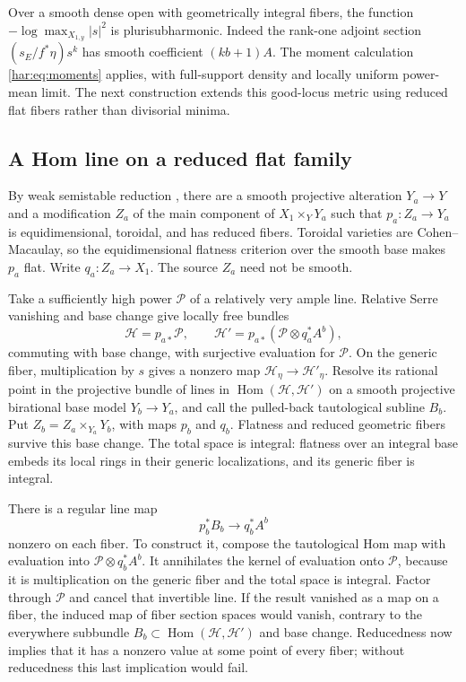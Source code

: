 Over a smooth dense open with geometrically integral fibers, the
function \(-\log\max_{X_{1,y}}|s|^2\) is plurisubharmonic. Indeed the
rank-one adjoint section \((s_E/f^*\eta)s^k\) has smooth coefficient
\((kb+1)A\). The moment calculation
\eqref{har:eq:moments} applies, with full-support density and locally
uniform power-mean limit. The next construction extends this good-locus
metric using reduced flat fibers rather than divisorial minima.

\subsection{A Hom line on a reduced flat family}\label{har:subsec:homline}

By weak semistable reduction \cite[Theorem~0.3]{AK2000},
there are a smooth projective alteration \(Y_a\to Y\) and a
modification \(Z_a\) of the main component of \(X_1\times_Y Y_a\)
such that \(p_a:Z_a\to Y_a\) is equidimensional, toroidal, and has
reduced fibers. Toroidal varieties are Cohen--Macaulay, so the
equidimensional flatness criterion over the smooth base makes
\(p_a\) flat. Write \(q_a:Z_a\to X_1\). The source \(Z_a\) need not
be smooth.

Take a sufficiently high power \(\mathcal P\) of a relatively very
ample line. Relative Serre vanishing and base change give locally
free bundles
\[
 \mathcal H=p_{a*}\mathcal P,\qquad
 \mathcal H'=p_{a*}(\mathcal P\otimes q_a^*A^b),
\]
commuting with base change, with surjective evaluation for
\(\mathcal P\). On the generic fiber, multiplication by \(s\) gives
a nonzero map \(\mathcal H_\eta\to\mathcal H'_\eta\). Resolve its
rational point in the projective bundle of lines in
\(\operatorname{Hom}(\mathcal H,\mathcal H')\) on a smooth projective
birational base model \(Y_b\to Y_a\), and call the pulled-back
tautological subline \(B_b\). Put \(Z_b=Z_a\times_{Y_a}Y_b\), with
maps \(p_b\) and \(q_b\). Flatness and reduced geometric fibers
survive this base change. The total space is integral: flatness over
an integral base embeds its local rings in their generic localizations,
and its generic fiber is integral.

There is a regular line map
\begin{equation}\label{har:eq:homline}
 p_b^*B_b\longrightarrow q_b^*A^b
\end{equation}
nonzero on each fiber. To construct it, compose the tautological Hom
map with evaluation into \(\mathcal P\otimes q_b^*A^b\). It
annihilates the kernel of evaluation onto \(\mathcal P\), because
it is multiplication on the generic fiber and the total space is
integral. Factor through \(\mathcal P\) and cancel that invertible
line. If the result vanished as a map on a fiber, the induced map
of fiber section spaces would vanish, contrary to the everywhere
subbundle \(B_b\subset\operatorname{Hom}(\mathcal H,\mathcal H')\)
and base change. Reducedness now implies that it has a nonzero
value at some point of every fiber; without reducedness this last
implication would fail.

